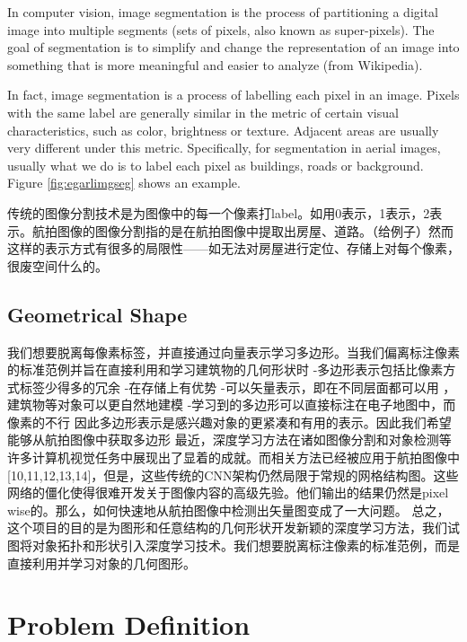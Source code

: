 In computer vision, image segmentation is the process of partitioning a digital image into multiple segments (sets of pixels, also known as super-pixels). The goal of segmentation is to simplify and change the representation of an image into something that is more meaningful and easier to analyze (from Wikipedia).

In fact, image segmentation is a process of labelling each pixel in an image. Pixels with the same label are generally similar in the metric of certain visual characteristics, such as color, brightness or texture. Adjacent areas are usually very different under this metric. Specifically, for segmentation in aerial images, usually what we do is to label each pixel as buildings, roads or background. Figure \ref{fig:egarlimgseg} shows an example.



传统的图像分割技术是为图像中的每一个像素打label。如用0表示，1表示，2表示。航拍图像的图像分割指的是在航拍图像中提取出房屋、道路。（给例子）然而这样的表示方式有很多的局限性——如无法对房屋进行定位、存储上对每个像素，很废空间什么的。


\subsection{Geometrical Shape}\label{geosha}

我们想要脱离每像素标签，并直接通过向量表示学习多边形。当我们偏离标注像素的标准范例并旨在直接利用和学习建筑物的几何形状时
-多边形表示包括比像素方式标签少得多的冗余
-在存储上有优势
-可以矢量表示，即在不同层面都可以用	，建筑物等对象可以更自然地建模
-学习到的多边形可以直接标注在电子地图中，而像素的不行
因此多边形表示是感兴趣对象的更紧凑和有用的表示。因此我们希望能够从航拍图像中获取多边形
最近，深度学习方法在诸如图像分割和对象检测等许多计算机视觉任务中展现出了显着的成就。而相关方法已经被应用于航拍图像中[10,11,12,13,14]，但是，这些传统的CNN架构仍然局限于常规的网格结构图。这些网络的僵化使得很难开发关于图像内容的高级先验。他们输出的结果仍然是pixel wise的。那么，如何快速地从航拍图像中检测出矢量图变成了一大问题。
总之，这个项目的目的是为图形和任意结构的几何形状开发新颖的深度学习方法，我们试图将对象拓扑和形状引入深度学习技术。我们想要脱离标注像素的标准范例，而是直接利用并学习对象的几何图形。

\section{Problem Definition}\label{prodef}


